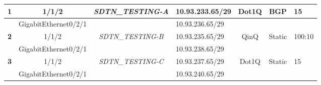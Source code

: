 \documentclass[a4paper,fleqn]{cas-dc}
\begin{document}
\begin{table}[]
\begin{tabular}{c|c|c|l|c|cl}
\multicolumn{1}{|c|}{\multirow{-2}{*}{\textbf{1}}}          & 1/1/2                                                           & \multirow{-2}{*}{\textit{SDTN\_TESTING-A}}                         & 10.93.233.65/29       & \multirow{-2}{*}{Dot1Q}                                         & \multicolumn{1}{c|}{\multirow{-2}{*}{BGP}}                          & \multicolumn{1}{l|}{\multirow{-2}{*}{15}}                     \\ \hline
\multicolumn{1}{|c|}{}                                      & GigabitEthernet0/2/1                                            &                                                                    & 10.93.236.65/29       &                                                                 & \multicolumn{1}{c|}{}                                               & \multicolumn{1}{l|}{}                                         \\ \cline{2-2} \cline{4-4}
\multicolumn{1}{|c|}{\multirow{-2}{*}{\textbf{2}}}          & 1/1/2                                                           & \multirow{-2}{*}{\textit{SDTN\_TESTING-B}}                         & 10.93.235.65/29       & \multirow{-2}{*}{QinQ}                                          & \multicolumn{1}{c|}{\multirow{-2}{*}{Static}}                       & \multicolumn{1}{l|}{\multirow{-2}{*}{100:10}}                 \\ \hline
\multicolumn{1}{|c|}{}                                      & GigabitEthernet0/2/1                                            &                                                                    & 10.93.238.65/29       &                                                                 & \multicolumn{1}{c|}{}                                               & \multicolumn{1}{l|}{}                                         \\ \cline{2-2} \cline{4-4}
\multicolumn{1}{|c|}{\multirow{-2}{*}{\textbf{3}}}          & 1/1/2                                                           & \multirow{-2}{*}{\textit{SDTN\_TESTING-C}}                         & 10.93.237.65/29       & \multirow{-2}{*}{Dot1Q}                                         & \multicolumn{1}{c|}{\multirow{-2}{*}{Static}}                       & \multicolumn{1}{l|}{\multirow{-2}{*}{15}}                     \\ \hline
\multicolumn{1}{|c|}{}                                      & GigabitEthernet0/2/1                                            &                                                                    & 10.93.240.65/29       &                                                                 & \multicolumn{1}{c|}{}                                               & \multicolumn{1}{l|}{}                                         \\ \cline{2-2} \cline{4-4}

\end{tabular}
\end{table}
\end{document}
